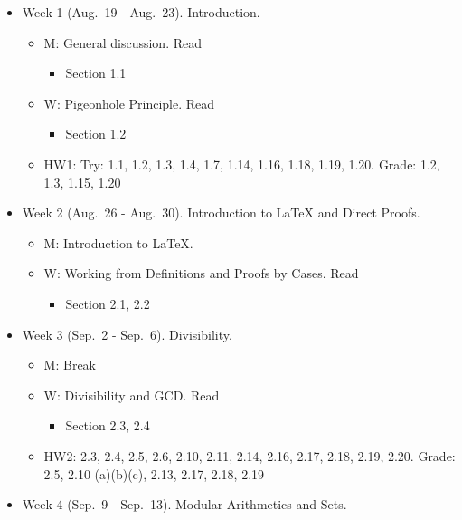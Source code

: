 \documentclass[
]{article}
\providecommand{\tightlist}{%
  \setlength{\itemsep}{0pt}\setlength{\parskip}{0pt}}
\begin{document}
\begin{itemize}
\item
  Week 1 (Aug.~19 - Aug.~23). Introduction.

  \begin{itemize}
  \tightlist
  \item
    M: General discussion. Read

    \begin{itemize}
    \tightlist
    \item
      Section 1.1
    \end{itemize}
  \item
    W: Pigeonhole Principle. Read

    \begin{itemize}
    \tightlist
    \item
      Section 1.2
    \end{itemize}
  \item
    HW1: Try: 1.1, 1.2, 1.3, 1.4, 1.7, 1.14, 1.16, 1.18, 1.19, 1.20. Grade: 1.2, 1.3, 1.15, 1.20
  \end{itemize}
\item
  Week 2 (Aug.~26 - Aug.~30). Introduction to LaTeX and Direct Proofs.

  \begin{itemize}
  \tightlist
  \item
    M: Introduction to LaTeX.
  \item
    W: Working from Definitions and Proofs by Cases. Read

    \begin{itemize}
    \tightlist
    \item
      Section 2.1, 2.2
    \end{itemize}
  \end{itemize}
\item
  Week 3 (Sep.~2 - Sep.~6). Divisibility.

  \begin{itemize}
  \tightlist
  \item
    M: Break
  \item
    W: Divisibility and GCD. Read

    \begin{itemize}
    \tightlist
    \item
      Section 2.3, 2.4
    \end{itemize}
  \item
    HW2: 2.3, 2.4, 2.5, 2.6, 2.10, 2.11, 2.14, 2.16, 2.17, 2.18, 2.19, 2.20. Grade: 2.5, 2.10 (a)(b)(c), 2.13, 2.17, 2.18, 2.19
  \end{itemize}
\item
  Week 4 (Sep.~9 - Sep.~13). Modular Arithmetics and Sets.


\end{itemize}
\end{document}
